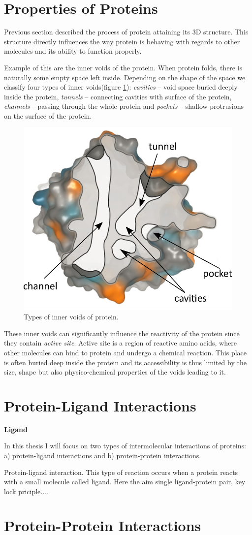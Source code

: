 \section{Properties of Proteins}
Previous section described the process of protein attaining its 3D structure. This structure directly influences the way protein is behaving with regards to other molecules and its ability to function properly.

Example of this are the inner voids of the protein. When protein folds, there is naturally some empty space left inside. Depending on the shape of the space we classify four types of inner voids(figure \ref{Fig:voids}): \textit{cavities} -- void space buried deeply inside the protein,  \textit{tunnels} -- connecting cavities with surface of the protein, \textit{channels} -- passing through the whole protein and \textit{pockets} -- shallow protrusions on the surface of the protein.

\begin{figure}[H]
  \centering
  \includegraphics[width=.5\textwidth]{pictures/Voids.pdf} 
  \caption{Types of inner voids of protein.}
  \label{Fig:voids}
\end{figure}

These inner voids can significantly influence the reactivity of the protein since they contain \textit{active site}. Active site is a region of reactive amino acids, where other molecules can bind to protein and undergo a chemical reaction. This place is often buried deep inside the protein and its accessibility is thus limited by the size, shape but also physico-chemical properties of the voids leading to it.

\section{Protein-Ligand Interactions}
\textbf{Ligand}


In this thesis I will focus on two types of intermolecular interactions of proteins: a) protein-ligand interactions and b) protein-protein interactions. 

Protein-ligand interaction. This type of reaction occurs when a protein reacts with a small molecule called ligand. Here the aim
single ligand-protein pair, key lock priciple....

\section{Protein-Protein Interactions}